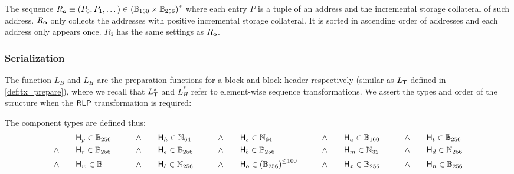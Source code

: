 The sequence $R_{\bf o}\equiv \left(P_0,P_1,\dots\right) \in \left(\mathbb{B}_{160} \times \mathbb{B}_{256}\right)^*$ where each entry $P$ is a tuple of an address and the incremental storage collateral of such address. $R_{\bf o}$ only collects the addresses with positive incremental storage collateral. It is sorted in ascending order of addresses and each address only appears once. $R_{\bf i}$ has the same settings as $R_{\bf o}$.

\subsubsection{Serialization}

The function $L_B$ and $L_H$ are the preparation functions for a block and block header respectively (similar as $L_{\textsf{T}}$ defined in \cref{def:tx_prepare}),
where we recall that $L_{\textsf{T}}^*$ and $L_H^*$ refer to element-wise sequence transformations.
We assert the types and order of the structure when the $\mathsf{RLP}$ transformation is required:

The component types are defined thus: 
\begin{align}
	& \head_p \in \B_{256} 
	\qquad &\land \qquad &\head_h\in \N_{64}
	\qquad &\land \qquad &\head_s\in \N_{64}
	\qquad &\land \qquad &\head_a\in \B_{160}
	\qquad &\land \qquad &\head_t\in \B_{256}
	\notag\\
	\land \qquad &\head_r\in \B_{256}
	\qquad & \land \qquad &\head_e\in \B_{256}
	\qquad &\land \qquad &\head_b\in \B_{256} 
	\qquad &\land \qquad &\head_m\in \N_{32}	
	\qquad &\land \qquad &\head_d\in \N_{256}	
	\notag\\
	\land \qquad &\head_w\in \B
	\qquad &\land \qquad &\head_\ell\in \N_{256}	%
	\qquad &\land \qquad &\head_{o} \in\left(\B_{256}\right)^{\le \numberofommers}
	\qquad &\land \qquad &\head_x\in \B_{256}
	\qquad &\land \qquad &\head_n\in \B_{256}
\end{align}

